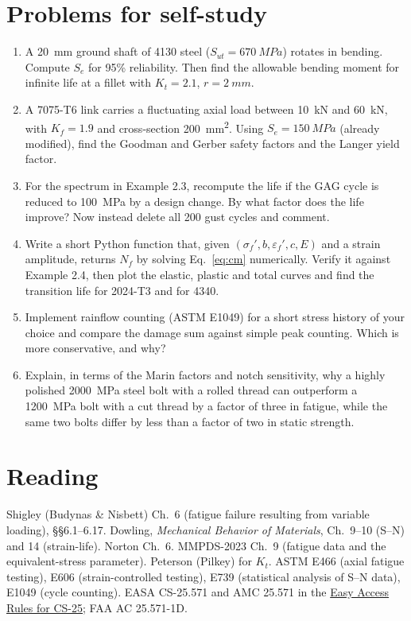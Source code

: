 \documentclass[11pt,a4paper]{article}
\begin{document}
\section{Problems for self-study}
\begin{enumerate}[nosep]
  \item A \SI{20}{mm} ground shaft of 4130 steel ($S_{ut}=\SI{670}{MPa}$) rotates in bending. Compute $S_e$ for 95\% reliability. Then find the allowable bending moment for infinite life at a fillet with $K_t=2.1$, $r=\SI{2}{mm}$.
  \item A 7075-T6 link carries a fluctuating axial load between \SI{10}{kN} and \SI{60}{kN}, with $K_f=1.9$ and cross-section \SI{200}{mm^2}. Using $S_e=\SI{150}{MPa}$ (already modified), find the Goodman and Gerber safety factors and the Langer yield factor.
  \item For the spectrum in Example 2.3, recompute the life if the GAG cycle is reduced to \SI{100}{MPa} by a design change. By what factor does the life improve? Now instead delete all 200 gust cycles and comment.
  \item Write a short Python function that, given $(\sigma_f',b,\varepsilon_f',c,E)$ and a strain amplitude, returns $N_f$ by solving Eq.~\eqref{eq:cm} numerically. Verify it against Example 2.4, then plot the elastic, plastic and total curves and find the transition life for 2024-T3 and for 4340.
  \item Implement rainflow counting (ASTM E1049) for a short stress history of your choice and compare the damage sum against simple peak counting. Which is more conservative, and why?
  \item Explain, in terms of the Marin factors and notch sensitivity, why a highly polished \SI{2000}{MPa} steel bolt with a rolled thread can outperform a \SI{1200}{MPa} bolt with a cut thread by a factor of three in fatigue, while the same two bolts differ by less than a factor of two in static strength.
\end{enumerate}

\section*{Reading}
Shigley (Budynas \& Nisbett) Ch.\ 6 (fatigue failure resulting from variable loading), \S\S6.1--6.17. Dowling, \emph{Mechanical Behavior of Materials}, Ch.\ 9--10 (S--N) and 14 (strain-life). Norton Ch.\ 6. MMPDS-2023 Ch.\ 9 (fatigue data and the equivalent-stress parameter). Peterson (Pilkey) for $K_t$. ASTM E466 (axial fatigue testing), E606 (strain-controlled testing), E739 (statistical analysis of S--N data), E1049 (cycle counting). EASA CS-25.571 and AMC 25.571 in the \href{https://www.easa.europa.eu/en/document-library/easy-access-rules/online-publications/easy-access-rules-large-aeroplanes-cs-25}{Easy Access Rules for CS-25}; FAA AC 25.571-1D.
\end{document}
